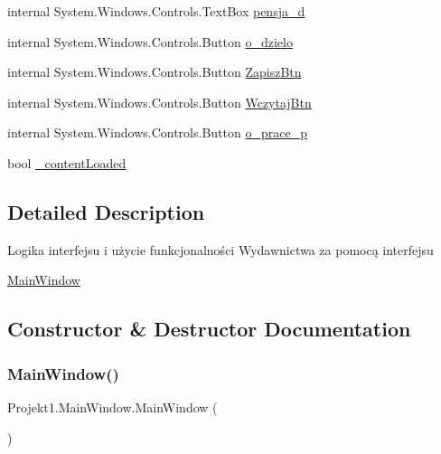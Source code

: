 \begin{DoxyCompactItemize}
\item 
internal System.\+Windows.\+Controls.\+Text\+Box \mbox{\hyperlink{class_projekt1_1_1_main_window_a022ee112d483138a6015a6cfaedf6278}{pensja\+\_\+d}}
\item 
internal System.\+Windows.\+Controls.\+Button \mbox{\hyperlink{class_projekt1_1_1_main_window_ab2763eb3750302ffae09b2b5693607b6}{o\+\_\+dzielo}}
\item 
internal System.\+Windows.\+Controls.\+Button \mbox{\hyperlink{class_projekt1_1_1_main_window_a9c1af4735589de8481ffd56c9f07f72a}{Zapisz\+Btn}}
\item 
internal System.\+Windows.\+Controls.\+Button \mbox{\hyperlink{class_projekt1_1_1_main_window_ad1914480771f994aff8a10600f3cd8a0}{Wczytaj\+Btn}}
\item 
internal System.\+Windows.\+Controls.\+Button \mbox{\hyperlink{class_projekt1_1_1_main_window_a6a8e8d52c240dcd4c4edb7bc81d80681}{o\+\_\+prace\+\_\+p}}
\item 
bool \mbox{\hyperlink{class_projekt1_1_1_main_window_adbccffa69972062444986a5af83ff5f5}{\+\_\+content\+Loaded}}
\end{DoxyCompactItemize}


\subsection{Detailed Description}
Logika interfejsu i użycie funkcjonalności Wydawnictwa za pomocą interfejsu 

\mbox{\hyperlink{class_projekt1_1_1_main_window}{Main\+Window}}

\subsection{Constructor \& Destructor Documentation}
\mbox{\label{class_projekt1_1_1_main_window_a70bc493e483144ca288af18f3f9ee7fb}} 
\subsubsection{\texorpdfstring{MainWindow()}{MainWindow()}}
{\footnotesize\ttfamily Projekt1.\+Main\+Window.\+Main\+Window (\begin{DoxyParamCaption}{ }\end{DoxyParamCaption})}



